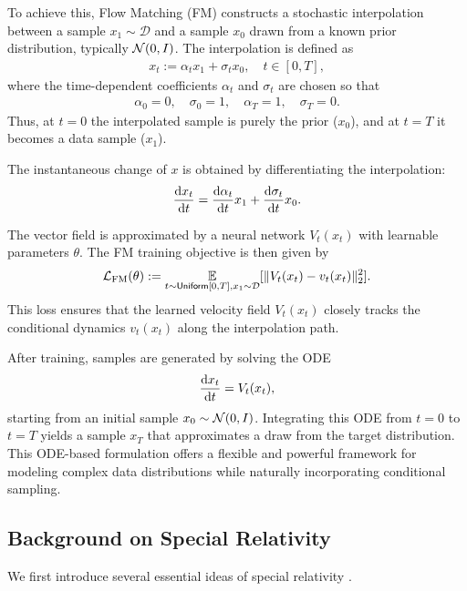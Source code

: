 To achieve this, Flow Matching (FM) constructs a stochastic interpolation between a sample $x_1 \sim \mathcal{D}$ and a sample $x_0$ drawn from a known prior distribution, typically $\mathcal{N}(0,I)$. The interpolation is defined as
\begin{align*}
    x_t := \alpha_t x_1 + \sigma_t x_0, \quad t\in [0,T],
\end{align*}
where the time-dependent coefficients $\alpha_t$ and $\sigma_t$ are chosen so that
\begin{align*}
    \alpha_0 = 0,\quad \sigma_0 = 1,\quad \alpha_T = 1,\quad \sigma_T = 0.
\end{align*}
Thus, at $t=0$ the interpolated sample is purely the prior ($x_0$), and at $t=T$ it becomes a data sample ($x_1$).

The instantaneous change of $x$ is obtained by differentiating the interpolation:
\begin{align*}
    \frac{\mathrm{d} x_t}{\mathrm{d} t} = \frac{\mathrm{d} \alpha_t}{\mathrm{d} t} x_1 + \frac{\mathrm{d} \sigma_t}{\mathrm{d} t} x_0.
\end{align*}

The vector field is approximated by a neural network $V_t(x_t)$ with learnable parameters $\theta$. The FM training objective is then given by
\begin{align*}
    \mathcal{L}_\mathrm{FM}(\theta) := \operatorname*{{\mathbb{E}}}_{t\sim {\sf Uniform}[0,T], x_1 \sim \mathcal{D}} [\| V_t(x_t) - v_t(x_t) \|_2^2 ].
\end{align*}
This loss ensures that the learned velocity field $V_t(x_t)$ closely tracks the conditional dynamics $v_t(x_t)$ along the interpolation path.

After training, samples are generated by solving the ODE
\begin{align*}
    \frac{\mathrm{d} x_t}{\mathrm{d} t} = V_t(x_t),
\end{align*}
starting from an initial sample $x_0 \sim \mathcal{N}(0,I)$. Integrating this ODE from $t=0$ to $t=T$ yields a sample $x_T$ that approximates a draw from the target distribution. This ODE-based formulation offers a flexible and powerful framework for modeling complex data distributions while naturally incorporating conditional sampling.

\subsection{Background on Special Relativity} \label{sub:special_relativity}

We first introduce several essential ideas of special relativity \cite{e+05}.

